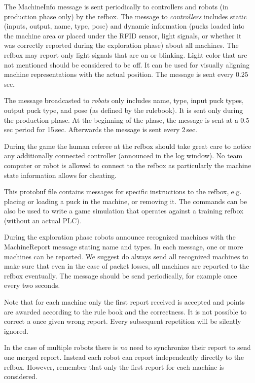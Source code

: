 \documentclass[a4paper]{article}
\begin{document}
%
{%
  The MachineInfo message is sent periodically to controllers and
  robots (in production phase only) by the refbox. The message to
  \emph{controllers} includes static (inputs, output, name, type,
  pose) and dynamic information (pucks loaded into the machine area or
  placed under the RFID sensor, light signals, or whether it was
  correctly reported during the exploration phase) about all machines.
  The refbox may report only light signals that are on or
  blinking. Light color that are not mentioned should be considered to
  be off. It can be used for visually aligning machine representations
  with the actual position. The message is sent every $0.25$\,sec.

  The message broadcasted to \emph{robots} only includes name, type,
  input puck types, output puck type, and pose (as defined by the
  rulebook). It is sent only during the production phase. At the
  beginning of the phase, the message is sent at a $0.5$\,sec period
  for 15\,sec. Afterwards the message is sent every 2\,sec.
 

  \medskip

  During the game the human referee at the refbox should take great
  care to notice any additionally connected controller (announced in
  the log window). No team computer or robot is allowed to connect to
  the refbox as particularly the machine state information allows for
  cheating.
}

%
{%
  This protobuf file contains messages for specific instructions to
  the refbox, e.g. placing or loading a puck in the machine, or
  removing it. The commands can be also be used to write a game
  simulation that operates against a training refbox (without an
  actual PLC).
}

%
{%
  During the exploration phase robots announce recognized machines
  with the MachineReport message stating name and types. In each
  message, one or more machines can be reported. We suggest do always
  send all recognized machines to make sure that even in the case of
  packet losses, all machines are reported to the refbox
  eventually. The message should be send periodically, for example
  once every two seconds.

  \medskip

  Note that for each machine only the first report received is
  accepted and points are awarded according to the rule book and the
  correctness. It is not possible to correct a once given wrong
  report. Every subsequent repetition will be silently ignored.

  \medskip

  In the case of multiple robots there is \emph{no} need to
  synchronize their report to send one merged report. Instead each
  robot can report independently directly to the refbox. However,
  remember that only the first report for each machine is considered.

}
\end{document}
